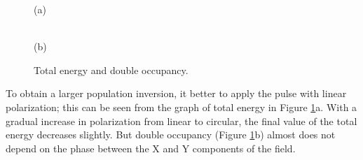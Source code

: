  
\begin{figure}[h!]
\begin{minipage}[h]{0.5\linewidth}
 (a) \\
\end{minipage}
\hfill
\begin{minipage}[h]{0.5\linewidth}
 \\(b)
\end{minipage}
\caption{Total energy and double occupancy.}
\label{fig:Etot_3}
\end{figure}


To obtain a larger population inversion, it better to apply the pulse with linear polarization; this can be seen from the graph of total energy in Figure \ref{fig:Etot_3}a. With a gradual increase in polarization from linear to circular, the final value of the total energy decreases slightly. But double occupancy (Figure \ref{fig:Etot_3}b) almost does not depend on the phase between the X and Y components of the field.

